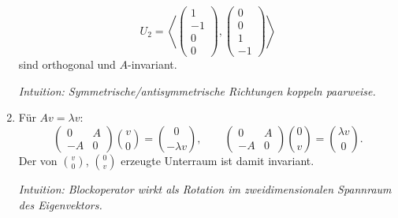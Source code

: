 \documentclass[11pt, a4paper]{article}
\begin{document}
\begin{enumerate}
\[    U_2=\left\langle \begin{pmatrix}1\\-1\\0\\0\end{pmatrix},
                       \begin{pmatrix}0\\0\\1\\-1\end{pmatrix}\right\rangle
  \]
  sind orthogonal und $A$-invariant.

  \medskip\noindent\textit{Intuition: Symmetrische/antisymmetrische Richtungen koppeln paarweise.}

  \item
  Für $Av=\lambda v$:
  \[
    \begin{pmatrix}0&A\\-A&0\end{pmatrix}\!\binom{v}{0}
      =\binom{0}{-\lambda v},\qquad
    \begin{pmatrix}0&A\\-A&0\end{pmatrix}\!\binom{0}{v}
      =\binom{\lambda v}{0}.
  \]
  Der von $\binom{v}{0}$, $\binom{0}{v}$ erzeugte Unterraum ist damit invariant.

  \medskip\noindent\textit{Intuition: Blockoperator wirkt als Rotation im zweidimensionalen Spannraum des Eigenvektors.}
\end{enumerate}
\end{document}
